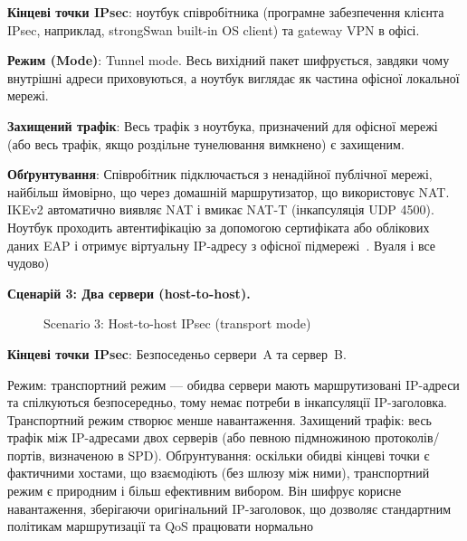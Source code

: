 \textbf{Кінцеві точки IPsec}: ноутбук співробітника (програмне забезпечення клієнта IPsec, наприклад, 
strongSwan built-in OS client) та gateway VPN в офісі.

\textbf{Режим (Mode)}: Tunnel mode. Весь вихідний пакет шифрується, завдяки чому внутрішні адреси приховуються, 
а ноутбук виглядає як частина офісної локальної мережі.

\textbf{Захищений трафік}: Весь трафік з ноутбука, призначений для офісної мережі (або весь трафік, якщо роздільне
тунелювання вимкнено) є захищеним.

\textbf{Обґрунтування}: Співробітник підключається з ненадійної публічної мережі, найбільш ймовірно, що через домашній 
маршрутизатор, що використовує NAT. IKEv2 автоматично виявляє NAT і вмикає NAT-T (інкапсуляція UDP 4500). Ноутбук 
проходить автентифікацію за допомогою сертифіката або облікових даних EAP і отримує віртуальну IP-адресу з 
офісної підмережі~\cite{rfc7296, rfc3948}. Вуаля і все чудово)

\bigskip
\noindent\textbf{Сценарій 3: Два сервери (host-to-host).}

\begin{figure}[!htbp]
    \centering
    \caption{Scenario 3: Host-to-host IPsec (transport mode)}
    \label{fig:h2h}
\end{figure}

\textbf{Кінцеві точки IPsec}: Безпоседеньо сервери~A та сервер~B. 

Режим: транспортний режим — обидва сервери
мають маршрутизовані IP-адреси та спілкуються безпосередньо, тому немає потреби в інкапсуляції IP-заголовка.
Транспортний режим створює менше навантаження. Захищений трафік: весь трафік між IP-адресами двох
серверів (або певною підмножиною протоколів/портів, визначеною в SPD). Обґрунтування: оскільки обидві
кінцеві точки є фактичними хостами, що взаємодіють (без шлюзу між ними), транспортний режим є природним і
більш ефективним вибором. Він шифрує корисне навантаження, зберігаючи оригінальний IP-заголовок, що
дозволяє стандартним політикам маршрутизації та QoS працювати нормально

